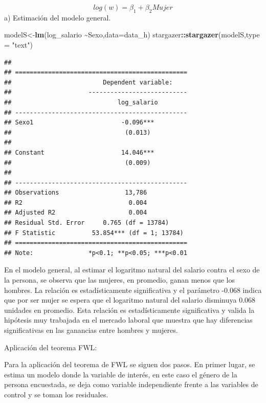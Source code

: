 \documentclass[
]{article}
\newenvironment{Shaded}{\begin{snugshade}}{\end{snugshade}}
\newcommand{\AttributeTok}[1]{\textcolor[rgb]{0.13,0.29,0.53}{#1}}
\newcommand{\FunctionTok}[1]{\textcolor[rgb]{0.13,0.29,0.53}{\textbf{#1}}}
\newcommand{\NormalTok}[1]{#1}
\newcommand{\OtherTok}[1]{\textcolor[rgb]{0.56,0.35,0.01}{#1}}
\newcommand{\SpecialCharTok}[1]{\textcolor[rgb]{0.81,0.36,0.00}{\textbf{#1}}}
\newcommand{\StringTok}[1]{\textcolor[rgb]{0.31,0.60,0.02}{#1}}
\begin{document}
\[log(w) = \beta_{1} + \beta_{2}Mujer\]a) Estimación del modelo general.

\begin{Shaded}
\begin{Highlighting}[]
\NormalTok{modelS}\OtherTok{\textless{}{-}}\FunctionTok{lm}\NormalTok{(log\_salario }\SpecialCharTok{\textasciitilde{}}\NormalTok{Sexo,}\AttributeTok{data=}\NormalTok{data\_h)}
\NormalTok{stargazer}\SpecialCharTok{::}\FunctionTok{stargazer}\NormalTok{(modelS,}\AttributeTok{type =} \StringTok{"text"}\NormalTok{)}
\end{Highlighting}
\end{Shaded}

\begin{verbatim}
## 
## ===============================================
##                         Dependent variable:    
##                     ---------------------------
##                             log_salario        
## -----------------------------------------------
## Sexo1                        -0.096***         
##                               (0.013)          
##                                                
## Constant                     14.046***         
##                               (0.009)          
##                                                
## -----------------------------------------------
## Observations                  13,786           
## R2                             0.004           
## Adjusted R2                    0.004           
## Residual Std. Error     0.765 (df = 13784)     
## F Statistic          53.854*** (df = 1; 13784) 
## ===============================================
## Note:               *p<0.1; **p<0.05; ***p<0.01
\end{verbatim}

En el modelo general, al estimar el logaritmo natural del salario contra
el sexo de la persona, se observa que las mujeres, en promedio, ganan
menos que los hombres. La relación es estadísticamente significativa y
el parámetro -0.068 indica que por ser mujer se espera que el logaritmo
natural del salario disminuya 0.068 unidades en promedio. Esta relación
es estadísticamente significativa y valida la hipótesis muy trabajada en
el mercado laboral que muestra que hay diferencias significativas en las
ganancias entre hombres y mujeres.

Aplicación del teorema FWL:

Para la aplicación del teorema de FWL se siguen dos pasos. En primer
lugar, se estima un modelo donde la variable de interés, en este caso el
género de la persona encuestada, se deja como variable independiente
frente a las variables de control y se toman los residuales.
\end{document}

